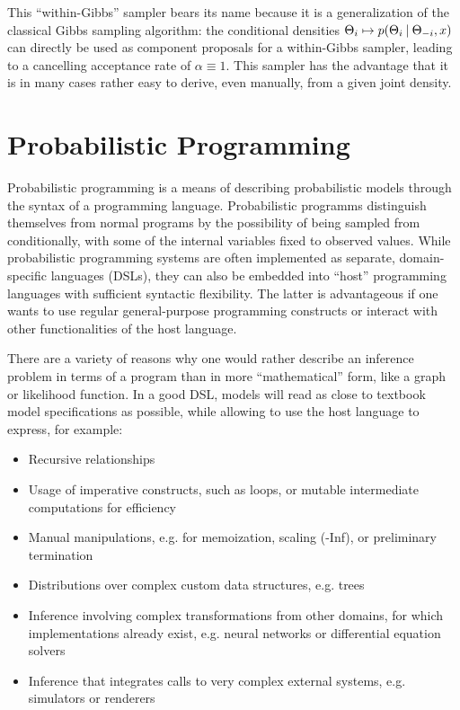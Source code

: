 This \enquote{within-Gibbs} sampler bears its name because it is a generalization of the classical
Gibbs sampling algorithm: the conditional densities
\(\Theta_{i} \mapsto p(\Theta_{i} \:\vert\: \Theta_{-i}, x)\) can directly be used as component
proposals for a within-Gibbs sampler, leading to a cancelling acceptance rate of
\(\alpha \equiv 1\).  This sampler has the advantage that it is in many cases rather easy to derive,
even manually, from a given joint density.


\section{Probabilistic Programming}
\label{sec:prob-prog}

Probabilistic programming is a means of describing probabilistic models through the syntax of a
programming language. Probabilistic programms distinguish themselves from normal programs by the
possibility of being sampled from conditionally, with some of the internal variables fixed to
observed values.  While probabilistic programming systems are often implemented as separate,
domain-specific languages (DSLs), they can also be embedded into \enquote{host} programming
languages with sufficient syntactic flexibility.  The latter is advantageous if one wants to use
regular general-purpose programming constructs or interact with other functionalities of the host
language.

There are a variety of reasons why one would rather describe an inference problem in terms of a
program than in more \enquote{mathematical} form, like a graph or likelihood function.  In a good
DSL, models will read as close to textbook model specifications as possible, while allowing to use
the host language to express, for example:
\begin{itemize}
\item Recursive relationships
\item Usage of imperative constructs, such as loops, or mutable intermediate computations for
  efficiency
\item Manual manipulations, e.g. for memoization, scaling (-Inf), or preliminary termination
\item Distributions over complex custom data structures, e.g. trees
\item Inference involving complex transformations from other domains, for which implementations
  already exist, e.g. neural networks or differential equation solvers
\item Inference that integrates calls to very complex external systems, e.g. simulators or renderers
\end{itemize}

